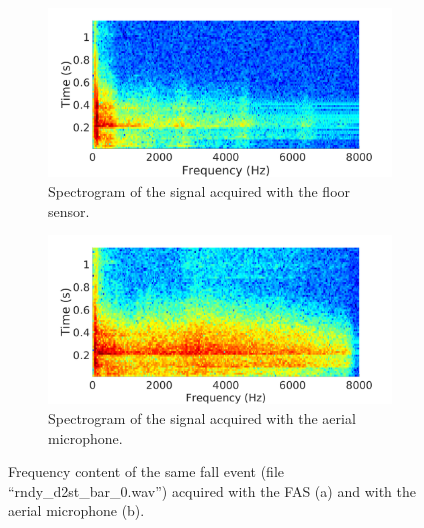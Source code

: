 \begin{figure}[t]
	\centering
	\begin{subfigure}[b]{0.8\textwidth}
		\includegraphics[width=\textwidth]{img/spettro_fas}
		\caption{Spectrogram of the signal acquired with the floor sensor.}
		\label{fig:spec_fas}
	\end{subfigure}
	\begin{subfigure}[b]{0.8\textwidth}
		\includegraphics[width=\textwidth]{img/spettro_mic}
		\caption{Spectrogram of the signal acquired with the aerial microphone.}
		\label{fig:spec_aer}
	\end{subfigure}
	
	\caption{Frequency content of the same fall event (file ``rndy\_d2st\_bar\_0.wav'') acquired with the FAS (a) and with the aerial microphone (b).}\label{fig:spectrograms}
\end{figure}

